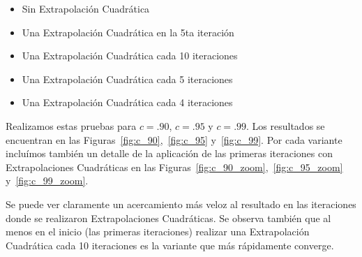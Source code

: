 \begin{itemize}
    \item Sin Extrapolación Cuadrática
    \item Una Extrapolación Cuadrática en la 5ta iteración
    \item Una Extrapolación Cuadrática cada 10 iteraciones
    \item Una Extrapolación Cuadrática cada 5 iteraciones
    \item Una Extrapolación Cuadrática cada 4 iteraciones
\end{itemize}

Realizamos estas pruebas para $c=.90$, $c=.95$ y $c=.99$. Los resultados se
encuentran en las Figuras~\ref{fig:c_90},~\ref{fig:c_95} y~\ref{fig:c_99}. Por
cada variante incluímos también un detalle de la aplicación de las primeras
iteraciones con Extrapolaciones Cuadráticas en las
Figuras~\ref{fig:c_90_zoom},~\ref{fig:c_95_zoom} y~\ref{fig:c_99_zoom}.

Se puede ver claramente un acercamiento más veloz al resultado en las
iteraciones donde se realizaron Extrapolaciones Cuadráticas. Se observa también
que al menos en el inicio (las primeras iteraciones) realizar una Extrapolación
Cuadrática cada 10 iteraciones es la variante que más rápidamente converge.

